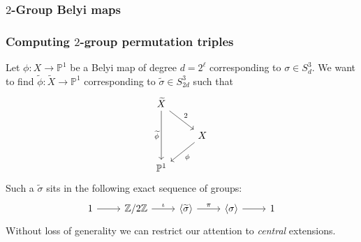 \documentclass[handout, xcolor=dvipsnames]{beamer}
\theoremstyle{plain}
\newcommand{\PP}{\mathbb P}
\newcommand{\Z}{\mathbb{Z}}
\newcommand{\wt}[1]{\widetilde{#1}}
\begin{document}
  \begin{frame}[plain]
    \frametitle{$2$-Group Belyi maps}
    \begin{center}
    \end{center}
  \end{frame}
  \begin{frame}[plain]
    \frametitle{Computing $2$-group permutation triples}
    Let $\phi:X\to\PP^1$ be a Belyi map
    of degree $d = 2^\ell$
    corresponding
    \newline
    to $\sigma\in S_d^3$.
    \pause
    We want to find $\wt{\phi}:\wt{X}\to\PP^1$ corresponding
    to $\wt{\sigma}\in S_{2d}^3$ such that
    \[
      \begin{tikzcd}[ampersand replacement=\&]
        \widetilde{X}\arrow{dd}[swap]{\widetilde{\phi}}\arrow{dr}{2}\\
        \&X\arrow{dl}{\phi}\\
        \PP^1
      \end{tikzcd}
    \]
    \pause
    Such a $\wt{\sigma}$ sits in the following exact sequence of groups:
    \[
      \begin{tikzcd}[ampersand replacement=\&, row sep = small]
        1\arrow{r}\&\Z/2\Z\arrow{r}{\iota}\&\langle\widetilde{\sigma}\rangle\arrow{r}{\pi}\&\langle\sigma\rangle\arrow{r}\&1
      \end{tikzcd}
    \]
    Without loss of generality we can restrict our attention to
    \emph{central} extensions.
  \end{frame}
\end{document}
